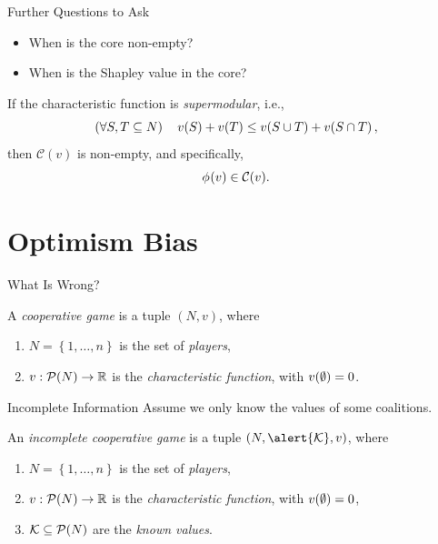 \documentclass[aspectratio=169]{beamer}
\begin{document}
\begin{frame}{Further Questions to Ask}
	\begin{itemize}[ ]
		\item When is the core non-empty?
		\item When is the Shapley value in the core?
	\end{itemize}
	\vspace{1em}
	\begin{theorem}
		If the characteristic function is \emph{supermodular}, i.e., \[
			\left( \forall S,T \subseteq N \right)\quad v\!\left(S\right) + v\!\left(T\right) \leq v\!\left(S \cup T\right) + v\!\left(S \cap T\right),
		\]
		then $ \mathcal{C}(v) $ is non-empty, and specifically, \[
			\phi_{}\!\left(v\right) \in \mathcal{C}(v).
		\]
	\end{theorem}
\end{frame}

\section{Optimism Bias}

\begin{frame}{What Is Wrong?}
	\begin{definition}
		A \emph{cooperative game} is a tuple $ \left( N,v \right) $, where \begin{enumerate}
			\item $ N = \left\{ 1, \ldots, n \right\} $ is the set of \emph{players},
			\item $ v: \mathcal{P}\!\left(N\right) \to \mathbb{R} $ is the \emph{characteristic function}, with $ v\!\left(\emptyset\right) = 0 $.
		\end{enumerate}
	\end{definition}
\end{frame}

\begin{frame}{Incomplete Information}
	Assume we only know the values of some coalitions.
	\vspace{3em}
	\begin{definition}
		An \emph{incomplete cooperative game} is a tuple $ \left( N,\alert{\k},v \right) $, where \begin{enumerate}
			\item $ N = \left\{ 1, \ldots, n \right\} $ is the set of \emph{players},
			\item $ v: \mathcal{P}\!\left(N\right) \to \mathbb{R} $ is the \emph{characteristic function}, with $ v\!\left(\emptyset\right) = 0 $,
			\item \alert{$ \mathcal{K} \subseteq \mathcal{P}\!\left(N\right) $ are the \emph{known values}.}
		\end{enumerate}
	\end{definition}
\end{frame}
\end{document}
